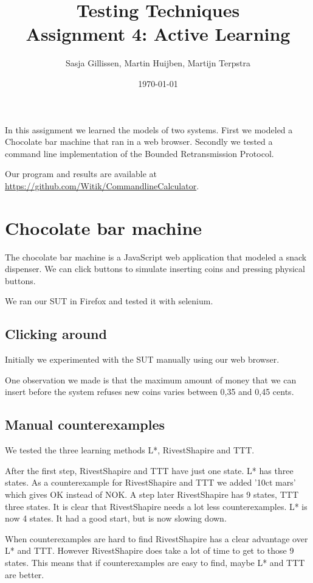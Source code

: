 \documentclass[11pt,a4paper]{article}
\author{Sasja Gillissen, Martin Huijben, Martijn Terpstra}
\date{\today}
\title{Testing Techniques\\
  \textbf{Assignment 4: Active Learning}}
\begin{document}
\maketitle

In this assignment we learned the models of two systems. First we
modeled a Chocolate bar machine that ran in a web browser. Secondly we
tested a command line implementation of the Bounded Retransmission Protocol.

Our program and results are available at \url{https://github.com/Witik/CommandlineCalculator}.

\section{Chocolate bar machine}
The chocolate bar machine is a JavaScript web application that modeled
a snack dispenser. We can click buttons to simulate inserting coins
and pressing physical buttons.

We ran our SUT in Firefox and tested it with selenium.

\subsection{Clicking around}
Initially we experimented with the SUT manually using our web browser.

One observation we made is that the maximum amount of money that we
can insert before the system refuses new coins varies between 0,35 and
0,45 cents.

\subsection{Manual counterexamples}
We tested the three learning methods L*, RivestShapire and TTT.

After the first step, RivestShapire and TTT have just one state. L*
has three states. As a counterexample for RivestShapire and TTT we
added '10ct mars' which gives OK instead of NOK. A step later
RivestShapire has 9 states, TTT three states. It is clear that
RivestShapire needs a lot less counterexamples. L* is now 4 states. It
had a good start, but is now slowing down.

When counterexamples are hard to find RivestShapire has a clear
advantage over L* and TTT. However RivestShapire does take a lot of
time to get to those 9 states. This means that if counterexamples are
easy to find, maybe L* and TTT are better.

\end{document}
